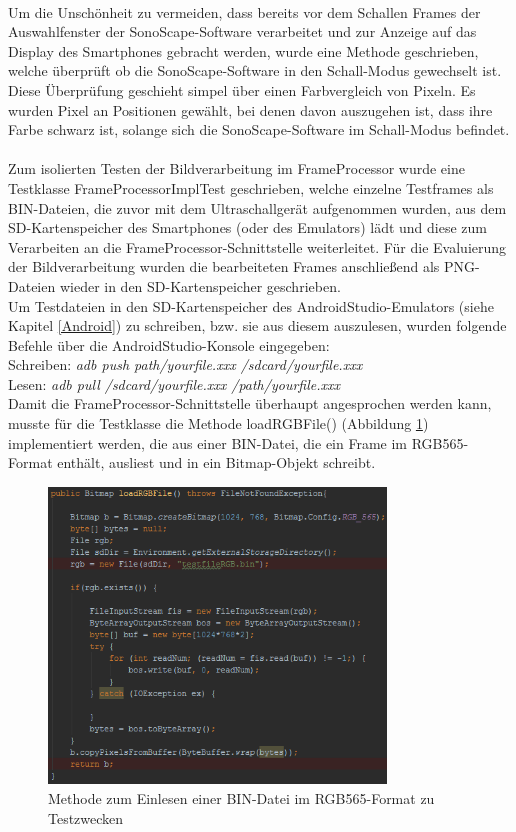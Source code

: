 \clearpage
~\\
Um die Unschönheit zu vermeiden, dass bereits vor dem Schallen Frames der Auswahlfenster der SonoScape-Software verarbeitet und zur Anzeige auf das Display des Smartphones gebracht werden, wurde eine Methode geschrieben, welche überprüft ob die SonoScape-Software in den Schall-Modus gewechselt ist. Diese Überprüfung geschieht simpel über einen Farbvergleich von Pixeln. Es wurden Pixel an Positionen gewählt, bei denen davon auszugehen ist, dass ihre Farbe schwarz ist, solange sich die SonoScape-Software im Schall-Modus befindet.  
\\
\\
Zum isolierten Testen der Bildverarbeitung im FrameProcessor wurde eine Testklasse FrameProcessorImplTest geschrieben, welche einzelne Testframes als BIN-Dateien, die zuvor mit dem Ultraschallgerät aufgenommen wurden, aus dem SD-Kartenspeicher des Smartphones (oder des Emulators) lädt und diese zum Verarbeiten an die FrameProcessor-Schnittstelle weiterleitet. Für die Evaluierung der Bildverarbeitung wurden die bearbeiteten Frames anschließend als PNG-Dateien wieder in den SD-Kartenspeicher geschrieben. 
\\
Um Testdateien in den SD-Kartenspeicher des AndroidStudio-Emulators (siehe Kapitel \ref{Android}) zu schreiben, bzw. sie aus diesem auszulesen, wurden folgende Befehle über die AndroidStudio-Konsole eingegeben:
\\
Schreiben: \textit{adb push path/yourfile.xxx /sdcard/yourfile.xxx}
\\
Lesen: \textit{adb pull /sdcard/yourfile.xxx /path/yourfile.xxx}
\\
Damit die FrameProcessor-Schnittstelle überhaupt angesprochen werden kann, musste für die Testklasse die Methode loadRGBFile() (Abbildung \ref{fig:BIN_to_Bitmap}) implementiert werden, die aus einer BIN-Datei, die ein Frame im RGB565-Format enthält, ausliest und in ein Bitmap-Objekt schreibt. 

\clearpage
\begin{figure}[h]
	\centering
	\includegraphics[width=0.8\textwidth]{Bilder/Bildverarbeitung/BIN_to_Bitmap.PNG}
	\caption{Methode zum Einlesen einer BIN-Datei im RGB565-Format zu Testzwecken}
	\label{fig:BIN_to_Bitmap}
\end{figure}